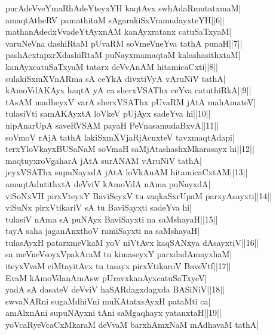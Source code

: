 \documentclass{article}
\begin{document}
purAdeVveYmaRhAdeYteyxYH kaqtAvx swhAdaRmutatxmaM|\\
amaqtAtheRV pamathitaM sAgarakiSxVramudayxteYH||6||\\
mathanAdedxVvadeYtAyxnAM kanAyxratanx catuSaTxyaM|\\
varuNeVna dashiRtaM pUvaRM soVmeVneYva tathA punaH||7||\\
pashAcxtapxrXdashiRtaM puNayxmamaqtaM kalashasithxtaM|\\
kanAyxcatuSaTxyaM tatarx deVvAnAM hitamicaCxti||8||\\
sulakiSxmXVnARma sA ceYkA divxtiVyA vAruNiV tathA|\\
kAmoVdAKAyx haqtA yA ca sherxVSAThx ceYva catuthiRkA||9||\\
tAsAM madheyxV varA sherxVSAThx pUvaRM jAtA mahAmateV|\\
tulasiVti samAKAyxtA loVkeV pUjAyx sadeYva hi||10||\\
nipAnarUpA saveRVSAM payaH PeVnasamudaBxvA||11||\\
soVmoV rAjA tathA lakiSxmXVjaRjAcnxteV tavxmaqtAdapi|\\
terxYloVkayxBUSaNaM soVmaH saMjAtashashxMkarasayx hi||12||\\
maqtuyxroVgaharA jAtA surANAM vAruNiV tathA|\\
jeyxVSAThx supuNayxdA jAtA loVkAnAM hitamicaCxtAM||13||\\
amaqtAdutithxtA deVviV kAmoVdA nAma puNayxdA|\\
viSoNxVH pirxVteyxY BaviSeyxV tu vaqkaSxrUpaM parxyAsayxti||14||\\
viSuNx pirxVtikariV sA tu BaviSayxti sadeYva hi|\\
tulasiV nAma sA puNAyx BaviSayxti na saMshayaH||15||\\
tayA saha jaganAnxthoV ramiSayxti na saMshayaH|\\
tulasAyxH patarxmeVkaM yoV niVtAvx kaqSANxya dAsayxtiV||16||\\
sa meVneVsoyxVpakAraM tu kimaseyxY parxdadAmayxhaM|\\
iteyxVvaM ciMtayitAvx tu tasayx pirxVtikaroV BaveVtf||17||\\
EvaM kAmoVdanAmAsw pUravxkanAyxcatuSaTxyeV|\\
yadA sA dasateV deVviV haSARdagxdagxda BASiNiV||18||\\
swvaNARni sugaMdhiVni muKAtatxsAyxH pataMti ca|\\
amAlxnAni supuNAyxni tAni saMgaqhayx yatanxtaH||19||\\
yoVcaRyeVcaCxMkaraM deVvaM barxhAmxNaM mAdhavaM tathA|\\
\end{document}

